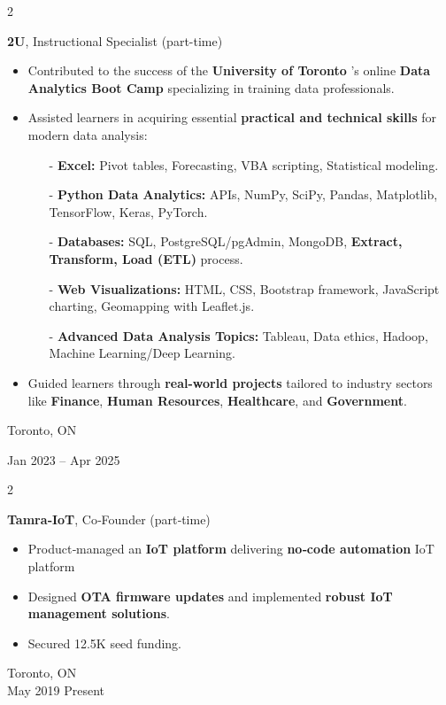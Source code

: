 \documentclass[10pt, letterpaper]{article}
\newenvironment{highlights}{
    \begin{itemize}[
        topsep=0.10 cm,
        parsep=0.10 cm,
        partopsep=0pt,
        itemsep=0pt,
        leftmargin=0.4 cm + 10pt
    ]
}{
    \end{itemize}
} %
\newenvironment{twocolentry}[2][]{
    \onecolentry
    \def\secondColumn{#2}
    \setcolumnwidth{\fill, 4.5 cm}
    \begin{paracol}{2}
}{
    \switchcolumn \raggedleft \secondColumn
    \end{paracol}
    \endonecolentry
} %
\begin{document}
        \begin{twocolentry}{
            Toronto, ON

        Jan 2023 – Apr 2025
        }
            \textbf{2U}, Instructional Specialist (part-time)
    
            \begin{highlights}
    \item Contributed to the success of the \textbf{University of Toronto} 's online \textbf{Data Analytics Boot Camp} specializing in training data professionals.
    \item Assisted learners in acquiring essential \textbf{practical and technical skills} for modern data analysis:
    \begin{enumerate}
        \item[-] \textbf{Excel:} Pivot tables, Forecasting, VBA scripting, Statistical modeling.
        \item[-] \textbf{Python Data Analytics:} APIs, NumPy, SciPy, Pandas, Matplotlib, TensorFlow, Keras, PyTorch.
        \item[-] \textbf{Databases:} SQL, PostgreSQL/pgAdmin, MongoDB, \textbf{Extract, Transform, Load (ETL)} process.
        \item[-] \textbf{Web Visualizations:} HTML, CSS, Bootstrap framework, JavaScript charting, Geomapping with Leaflet.js.
        \item[-] \textbf{Advanced Data Analysis Topics:} Tableau, Data ethics, Hadoop, Machine Learning/Deep Learning.
    \end{enumerate}
    \item Guided learners through \textbf{real-world projects} tailored to industry sectors like \textbf{Finance}, \textbf{Human Resources}, \textbf{Healthcare}, and \textbf{Government}.
\end{highlights}

        \end{twocolentry}
     \vspace{0.2 cm}
\vspace{0.2cm}
\begin{twocolentry}{Toronto, ON \\ May 2019 Present}
\textbf{Tamra‑IoT}, Co‑Founder (part‑time)
\begin{highlights}
\item Product‑managed an \textbf{IoT platform} delivering \textbf{no‑code automation} IoT platform
\item Designed \textbf{OTA firmware updates} and implemented \textbf{robust IoT management solutions}.
\item Secured \EUR12.5K seed funding.
\end{highlights}
\end{twocolentry}
\end{document}
